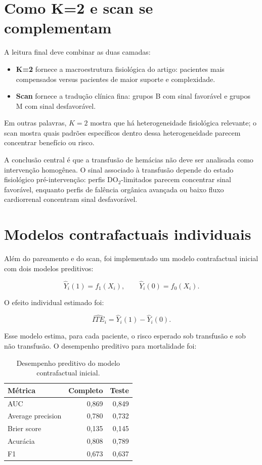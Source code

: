 \section{Como K=2 e scan se complementam}

A leitura final deve combinar as duas camadas:

\begin{itemize}[leftmargin=1.5em, itemsep=0.25em]
  \item \textbf{K=2} fornece a macroestrutura fisiológica do artigo: pacientes mais compensados versus pacientes de maior suporte e complexidade.
  \item \textbf{Scan} fornece a tradução clínica fina: grupos B com sinal favorável e grupos M com sinal desfavorável.
\end{itemize}

Em outras palavras, $K=2$ mostra que há heterogeneidade fisiológica relevante; o scan mostra quais padrões específicos dentro dessa heterogeneidade parecem concentrar benefício ou risco.

\begin{boxsummary}
A conclusão central é que a transfusão de hemácias não deve ser analisada como intervenção homogênea. O sinal associado à transfusão depende do estado fisiológico pré-intervenção: perfis DO$_2$-limitados parecem concentrar sinal favorável, enquanto perfis de falência orgânica avançada ou baixo fluxo cardiorrenal concentram sinal desfavorável.
\end{boxsummary}

\section{Modelos contrafactuais individuais}

Além do pareamento e do scan, foi implementado um modelo contrafactual inicial com dois modelos preditivos:

\[
\hat{Y}_i(1)=f_1(X_i),
\qquad
\hat{Y}_i(0)=f_0(X_i).
\]

O efeito individual estimado foi:

\[
\widehat{ITE}_i = \hat{Y}_i(1)-\hat{Y}_i(0).
\]

Esse modelo estima, para cada paciente, o risco esperado sob transfusão e sob não transfusão. O desempenho preditivo para mortalidade foi:

\begin{table}[ht]
\centering
\caption{Desempenho preditivo do modelo contrafactual inicial.}
\begin{tabular}{lrr}
\toprule
Métrica & Completo & Teste \\
\midrule
AUC & 0,869 & 0,849 \\
Average precision & 0,780 & 0,732 \\
Brier score & 0,135 & 0,145 \\
Acurácia & 0,808 & 0,789 \\
F1 & 0,673 & 0,637 \\
\bottomrule
\end{tabular}
\end{table}

